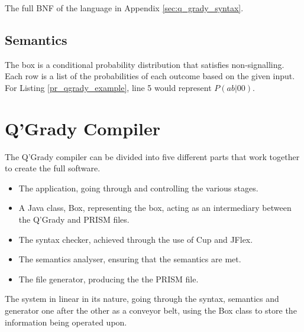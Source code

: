 \documentclass[report.tex]{subfiles}
\begin{document}
The full BNF of the language in Appendix \ref{sec:q_grady_syntax}.

\subsection{Semantics} %
\label{sec:semantics}
The box is a conditional probability distribution that satisfies non-signalling.
Each row is a list of the probabilities of each outcome based on the given
input. For Listing \ref{pr_qgrady_example}, line 5 would represent 
\(P(ab | 00)\).

\section{Q'Grady Compiler} %
\label{sec:q_grady_compiler}
The Q'Grady compiler can be divided into five different parts that work
together to create the full software.
\begin{itemize}
    \item The application, going through and controlling the various stages.
    \item A Java class, Box, representing the box, acting as an intermediary
    between the Q'Grady and PRISM files.
    \item The syntax checker, achieved through the use of Cup and JFlex.
    \item The semantics analyser, ensuring that the semantics are met.
    \item The file generator, producing the the PRISM file.
\end{itemize}

The system in linear in its nature, going through the syntax, semantics and
generator one after the other as a conveyor belt, using the Box class to store
the information being operated upon.
\end{document}
